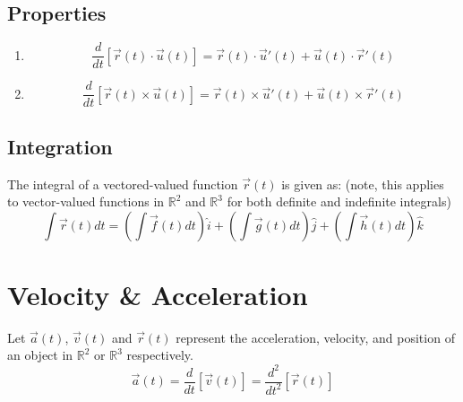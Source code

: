 \subsection{Properties}
\begin{enumerate}
  \item $$\frac{d}{dt}[\vec{r}(t)\cdot\vec{u}(t)] = \vec{r}(t)\cdot\vec{u}'(t) +
                                                    \vec{u}(t)\cdot\vec{r}'(t)$$
  \item $$\frac{d}{dt}[\vec{r}(t)\times\vec{u}(t)]=\vec{r}(t)\times\vec{u}'(t) +
                                                   \vec{u}(t)\times\vec{r}'(t)$$
\end{enumerate}

\subsection{Integration}
The integral of a vectored-valued function $\vec{r}(t)$ is given as: (note, this
applies to vector-valued functions in $\mathbb{R}^2$ and $\mathbb{R}^3$ for both
definite and indefinite integrals)
\begin{equation}
  \int \vec{r}(t) dt = \left(\int \vec{f}(t) dt\right)\hat{i} +
                       \left(\int \vec{g}(t) dt\right)\hat{j} +
                       \left(\int \vec{h}(t) dt\right)\hat{k}
\end{equation}

\section{Velocity \& Acceleration}
Let $\vec{a}(t)$, $\vec{v}(t)$ and $\vec{r}(t)$ represent the acceleration,
velocity, and position of an object in $\mathbb{R}^2$ or $\mathbb{R}^3$
respectively.
\begin{equation}
  \vec{a}(t) = \frac{d}{dt}\left[\vec{v}(t)\right]
             = \frac{d^2}{dt^2}\left[\vec{r}(t)\right]
\end{equation}
